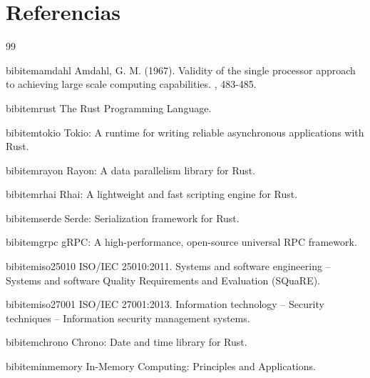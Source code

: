 \chapter{Referencias}

\bigskip

\begin{thebibliography}{99}

\bigskip

bibitem{amdahl}
Amdahl, G. M. (1967).
\newblock Validity of the single processor approach to achieving large scale computing capabilities.
, 483-485.

\bigskip

bibitem{rust}
The Rust Programming Language.

\bigskip

bibitem{tokio}
Tokio: A runtime for writing reliable asynchronous applications with Rust.

\bigskip

bibitem{rayon}
Rayon: A data parallelism library for Rust.

\bigskip

bibitem{rhai}
Rhai: A lightweight and fast scripting engine for Rust.

\bigskip

bibitem{serde}
Serde: Serialization framework for Rust.

\bigskip

bibitem{grpc}
gRPC: A high-performance, open-source universal RPC framework.

\bigskip

bibitem{iso25010}
ISO/IEC 25010:2011.
\newblock Systems and software engineering -- Systems and software Quality Requirements and Evaluation (SQuaRE).

\bigskip

bibitem{iso27001}
ISO/IEC 27001:2013.
\newblock Information technology -- Security techniques -- Information security management systems.

\bigskip

bibitem{chrono}
Chrono: Date and time library for Rust.

\bigskip

bibitem{inmemory}
In-Memory Computing: Principles and Applications.

\end{thebibliography}

\vfill
\newpage
